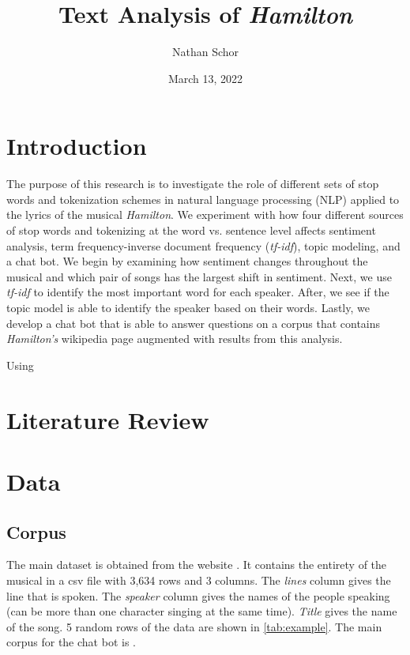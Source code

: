 \documentclass{article}
\title{Text Analysis of \emph{Hamilton}}
\author{Nathan Schor}
\date{March 13, 2022}
\begin{document}
\maketitle
\tableofcontents
\listoffigures

\section{Introduction}

The purpose of this research is to investigate the role of different sets of stop words and tokenization schemes in natural language processing (NLP) applied to the lyrics of the musical \emph{Hamilton}. We experiment with how four different sources of stop words and tokenizing at the word vs. sentence level affects sentiment analysis, term frequency-inverse document frequency (\emph{tf-idf}), topic modeling, and a chat bot. We begin by examining how sentiment changes throughout the musical and which pair of songs has the largest shift in sentiment. Next, we use \emph{tf-idf} to identify the most important word for each speaker. After, we see if the topic model is able to identify the speaker based on their words. Lastly, we develop a chat bot that is able to answer questions on a corpus that contains \emph{Hamilton's} wikipedia page augmented with results from this analysis. 

Using \cite{Silge2022}




\section{Literature Review}

\section{Data}

\subsection{Corpus}

The main dataset is obtained from the website \cite{Kaggle2019}. It contains the entirety of the musical in a csv file with 3,634 rows and 3 columns. The \emph{lines} column gives the line that is spoken. The \emph{speaker} column gives the names of the people speaking (can be more than one character singing at the same time). \emph{Title} gives the name of the song. 5 random rows of the data are shown in \ref{tab:example}. The main corpus for the chat bot is \cite{Wiki}.
\end{document}
